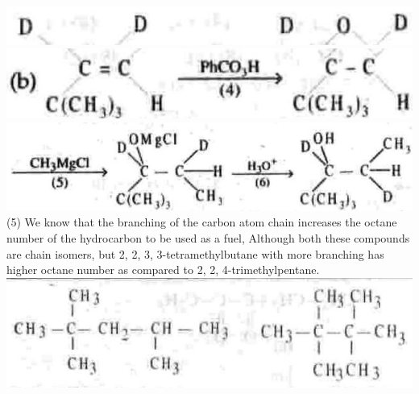\documentclass[10pt]{article}
\begin{document}
\includegraphics[max width=\textwidth, center]{2025_01_28_8470952b98110cec3aabg-247(2)}\\
\includegraphics[max width=\textwidth, center]{2025_01_28_8470952b98110cec3aabg-247(7)}\\
\includegraphics[max width=\textwidth, center]{2025_01_28_8470952b98110cec3aabg-247(1)}\\
(5) We know that the branching of the carbon atom chain increases the octane number of the hydrocarbon to be used as a fuel, Although both these compounds are chain isomers, but 2, 2, 3, 3-tetramethylbutane with more branching has higher octane number as compared to 2, 2, 4-trimethylpentane.\\
\includegraphics[max width=\textwidth, center]{2025_01_28_8470952b98110cec3aabg-248(3)}
\end{document}
